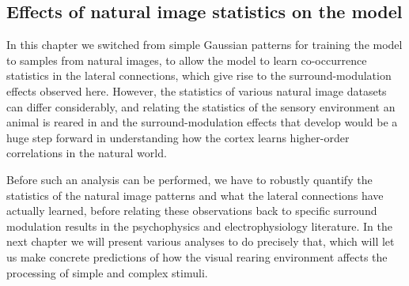 \subsection{Effects of natural image statistics on the model}

In this chapter we switched from simple Gaussian patterns for training
the model to samples from natural images, to allow the model to learn
co-occurrence statistics in the lateral connections, which give rise
to the surround-modulation effects observed here. However, the
statistics of various natural image datasets can differ considerably,
and relating the statistics of the sensory environment an animal is
reared in and the surround-modulation effects that develop would be a
huge step forward in understanding how the cortex learns higher-order
correlations in the natural world.

Before such an analysis can be performed, we have to robustly quantify
the statistics of the natural image patterns and what the lateral
connections have actually learned, before relating these observations
back to specific surround modulation results in the psychophysics and
electrophysiology literature. In the next chapter we will present
various analyses to do precisely that, which will let us make concrete
predictions of how the visual rearing environment affects the
processing of simple and complex stimuli.

